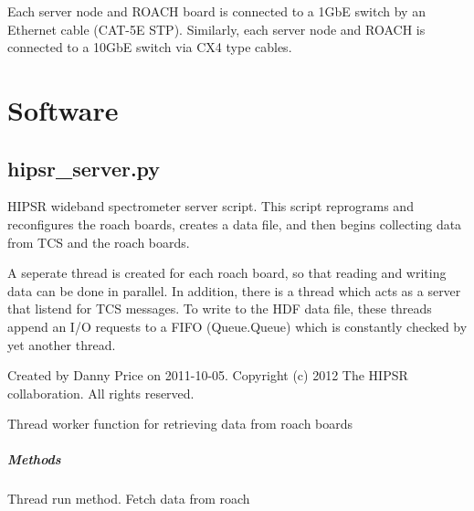 \documentclass[letterpaper,10pt,english]{sphinxmanual}
\begin{document}
Each server node and ROACH board is connected to a 1GbE switch by an Ethernet cable (CAT-5E STP). Similarly, each server node and ROACH is connected to a 10GbE switch via CX4 type cables.


\chapter{Software}
\label{software:module-hipsr_server}\label{software:software}\label{software::doc}\label{software:software-chapter}

\section{hipsr\_server.py}
\label{software:hipsr-server-py}
HIPSR wideband spectrometer server script. This script reprograms and reconfigures the roach
boards, creates a data file, and then begins collecting data from TCS and the roach boards.

A seperate thread is created for each roach board, so that reading and writing data can be done
in parallel. In addition, there is a thread which acts as a server that listend for TCS messages.
To write to the HDF data file, these threads append an I/O requests to a FIFO (Queue.Queue) which
is constantly checked by yet another thread.

Created by Danny Price on 2011-10-05.
Copyright (c) 2012 The HIPSR collaboration. All rights reserved.

\begin{fulllineitems}
\label{software:hipsr_server.DataFetcher}
Thread worker function for retrieving data from roach boards
\paragraph{Methods}

\begin{fulllineitems}
\label{software:hipsr_server.DataFetcher.run}
Thread run method. Fetch data from roach

\end{fulllineitems}


\end{fulllineitems}
\end{document}
